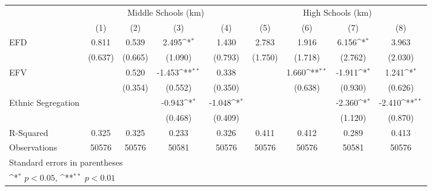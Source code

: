 {
\def\sym#1{\ifmmode^{#1}\else\(^{#1}\)\fi}
\begin{tabular}{l*{8}{c}}
\toprule
                    &\multicolumn{4}{c}{Middle Schools (km)}                                            &\multicolumn{4}{c}{High Schools (km)}                                              \\\cmidrule(lr){2-5}\cmidrule(lr){6-9}
                    &\multicolumn{1}{c}{(1)}        &\multicolumn{1}{c}{(2)}        &\multicolumn{1}{c}{(3)}        &\multicolumn{1}{c}{(4)}        &\multicolumn{1}{c}{(5)}        &\multicolumn{1}{c}{(6)}        &\multicolumn{1}{c}{(7)}        &\multicolumn{1}{c}{(8)}        \\
\midrule
EFD                 &       0.811        &       0.539        &       2.495\sym{*} &       1.430        &       2.783        &       1.916        &       6.156\sym{*} &       3.963        \\
                    &     (0.637)        &     (0.665)        &     (1.090)        &     (0.793)        &     (1.750)        &     (1.718)        &     (2.762)        &     (2.030)        \\
EFV                 &                    &       0.520        &      -1.453\sym{**}&       0.338        &                    &       1.660\sym{**}&      -1.911\sym{*} &       1.241\sym{*} \\
                    &                    &     (0.354)        &     (0.552)        &     (0.350)        &                    &     (0.638)        &     (0.930)        &     (0.626)        \\
Ethnic Segregation  &                    &                    &      -0.943\sym{*} &      -1.048\sym{*} &                    &                    &      -2.360\sym{*} &      -2.410\sym{**}\\
                    &                    &                    &     (0.468)        &     (0.409)        &                    &                    &     (1.120)        &     (0.870)        \\
\midrule
R-Squared           &\multicolumn{1}{c}{0.325}        &\multicolumn{1}{c}{0.325}        &\multicolumn{1}{c}{0.233}        &\multicolumn{1}{c}{0.326}        &\multicolumn{1}{c}{0.411}        &\multicolumn{1}{c}{0.412}        &\multicolumn{1}{c}{0.289}        &\multicolumn{1}{c}{0.413}        \\
Observations        &\multicolumn{1}{c}{50576}        &\multicolumn{1}{c}{50576}        &\multicolumn{1}{c}{50581}        &\multicolumn{1}{c}{50576}        &\multicolumn{1}{c}{50576}        &\multicolumn{1}{c}{50576}        &\multicolumn{1}{c}{50581}        &\multicolumn{1}{c}{50576}        \\
\bottomrule
\multicolumn{9}{l}{\footnotesize Standard errors in parentheses}\\
\multicolumn{9}{l}{\footnotesize \sym{*} \(p<0.05\), \sym{**} \(p<0.01\)}\\
\end{tabular}
}
